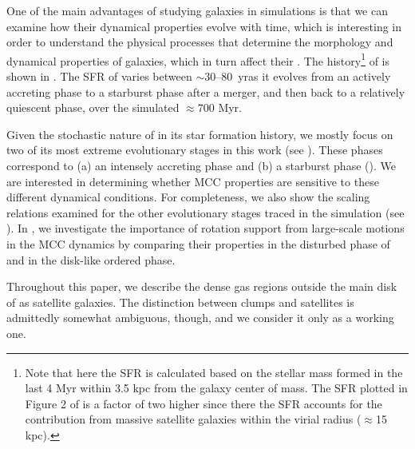 \IfFileExists{emulateapjlegacy.cls}{\documentclass[iop]{emulateapjlegacy}}{\documentclass[iop]{emulateapj}}
\begin{document}
One of the main advantages of studying galaxies in simulations is that we can examine how their dynamical properties evolve with time, which
is interesting in order to understand the physical processes that determine the morphology and dynamical properties of galaxies, which in turn affect their \SF.
%
The \SF history\footnote{Note that here the SFR is calculated based on
  the stellar mass formed in the last 4 Myr within 3.5 kpc from the
  galaxy center of mass. The SFR plotted in Figure 2 of
  \citet{Pallottini17b} is a factor of two higher since there the SFR
  accounts for the contribution from massive satellite galaxies within
  the virial radius ($\approx$15\,kpc).} of \flower is shown in
. The SFR of \flower varies between $\sim$30--80 \Msun\,yr\pmOne as it evolves from an actively accreting phase to a starburst phase after a merger, and then back to a relatively quiescent phase, over the simulated $\approx 700$ Myr.

Given the stochastic nature of \flower in its star formation history, we mostly focus on
two of its most extreme evolutionary stages in this work (see ).
These phases correspond to (a) an intensely accreting phase and
(b) a starburst phase (). We are interested in determining whether 
MCC properties are sensitive to these different dynamical
conditions. For completeness, we also show the scaling relations examined for the other evolutionary stages 
traced in the simulation (see ). 
In , we investigate the importance of rotation support from large-scale motions in the MCC dynamics by comparing their properties 
in the disturbed phase of \flower and in the disk-like ordered phase. 

Throughout this paper, we describe the dense gas regions outside the main disk of \flower as satellite galaxies.
The distinction between clumps and satellites is admittedly somewhat
ambiguous, though, and we consider it only as a working one.
\end{document}
